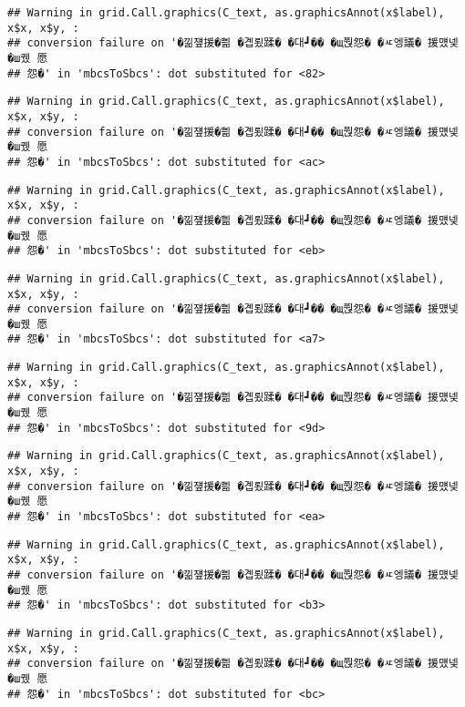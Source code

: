 \documentclass[
]{article}
\begin{document}
\begin{verbatim}
## Warning in grid.Call.graphics(C_text, as.graphicsAnnot(x$label), x$x, x$y, :
## conversion failure on '�낆쟾援�쁾 �곕룄蹂� �대┛�� �щ쭩怨� �ㅼ엥議� 援먰넻�ш퀬 愿
## 怨�' in 'mbcsToSbcs': dot substituted for <82>
\end{verbatim}

\begin{verbatim}
## Warning in grid.Call.graphics(C_text, as.graphicsAnnot(x$label), x$x, x$y, :
## conversion failure on '�낆쟾援�쁾 �곕룄蹂� �대┛�� �щ쭩怨� �ㅼ엥議� 援먰넻�ш퀬 愿
## 怨�' in 'mbcsToSbcs': dot substituted for <ac>
\end{verbatim}

\begin{verbatim}
## Warning in grid.Call.graphics(C_text, as.graphicsAnnot(x$label), x$x, x$y, :
## conversion failure on '�낆쟾援�쁾 �곕룄蹂� �대┛�� �щ쭩怨� �ㅼ엥議� 援먰넻�ш퀬 愿
## 怨�' in 'mbcsToSbcs': dot substituted for <eb>
\end{verbatim}

\begin{verbatim}
## Warning in grid.Call.graphics(C_text, as.graphicsAnnot(x$label), x$x, x$y, :
## conversion failure on '�낆쟾援�쁾 �곕룄蹂� �대┛�� �щ쭩怨� �ㅼ엥議� 援먰넻�ш퀬 愿
## 怨�' in 'mbcsToSbcs': dot substituted for <a7>
\end{verbatim}

\begin{verbatim}
## Warning in grid.Call.graphics(C_text, as.graphicsAnnot(x$label), x$x, x$y, :
## conversion failure on '�낆쟾援�쁾 �곕룄蹂� �대┛�� �щ쭩怨� �ㅼ엥議� 援먰넻�ш퀬 愿
## 怨�' in 'mbcsToSbcs': dot substituted for <9d>
\end{verbatim}

\begin{verbatim}
## Warning in grid.Call.graphics(C_text, as.graphicsAnnot(x$label), x$x, x$y, :
## conversion failure on '�낆쟾援�쁾 �곕룄蹂� �대┛�� �щ쭩怨� �ㅼ엥議� 援먰넻�ш퀬 愿
## 怨�' in 'mbcsToSbcs': dot substituted for <ea>
\end{verbatim}

\begin{verbatim}
## Warning in grid.Call.graphics(C_text, as.graphicsAnnot(x$label), x$x, x$y, :
## conversion failure on '�낆쟾援�쁾 �곕룄蹂� �대┛�� �щ쭩怨� �ㅼ엥議� 援먰넻�ш퀬 愿
## 怨�' in 'mbcsToSbcs': dot substituted for <b3>
\end{verbatim}

\begin{verbatim}
## Warning in grid.Call.graphics(C_text, as.graphicsAnnot(x$label), x$x, x$y, :
## conversion failure on '�낆쟾援�쁾 �곕룄蹂� �대┛�� �щ쭩怨� �ㅼ엥議� 援먰넻�ш퀬 愿
## 怨�' in 'mbcsToSbcs': dot substituted for <bc>
\end{verbatim}
\end{document}
